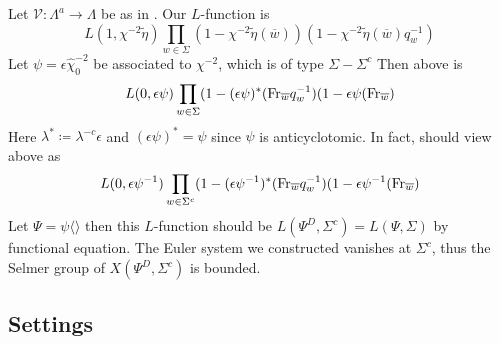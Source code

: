 \documentclass[leqno]{amsart}
\newcommand{\bw}{\overline{w}}
\newcommand{\Fr}{\textnormal{Fr}} %
\theoremstyle{definition}
\theoremstyle{remark}
\begin{document}
Let $\mathscr{V}\colon \Lambda^a\to \Lambda$
be as in \cite{HT94}.
Our $L$-function is
\[
L(1,\chi^{-2}\tilde{\eta})\prod_{w\in\Sigma}
(1-\chi^{-2}\tilde{\eta}(\bw))
(1-\chi^{-2}\tilde{\eta}(\bw)q_w^{-1})
\]
Let $\psi=\epsilon\hat{\chi}_0^{-2}$ be associated to 
$\chi^{-2}$, which is of type $\Sigma-\Sigma^c$
Then above is 
\[
	L(0,\epsilon\psi)\prod_{w\in \Sigma}
	(1-(\epsilon\psi)^*(\Fr_{\bw}q_w^{-1})
	(1-\epsilon\psi(\Fr_{\bw})
\]
Here  $\lambda^*\coloneqq \lambda^{-c}\epsilon$ 
and $(\epsilon\psi)^*=\psi$ since  $\psi$
is anticyclotomic.
In fact, should view above as
\[
	L(0,\epsilon\psi^{-1})\prod_{w\in\Sigma^c}
	(1-(\epsilon\psi^{-1})^*(\Fr_{\bw}q_w^{-1})
	(1-\epsilon\psi^{-1}(\Fr_{\bw})
\]
Let $\Psi=\psi\langle\rangle$
then this  $L$-function
should be $L(\Psi^D,\Sigma^c)=L(\Psi,\Sigma)$
by functional equation.
The Euler system we constructed vanishes at  $\Sigma^c$,
thus the Selmer group of  $X(\Psi^D,\Sigma^c)$
is bounded. 


\cite{Och05}
\cite{Och08}
\cite{Hsieh2010}
\cite{HT93}
\cite{Hida06}
\cite{Hida06b}
\cite{Rubin}

\subsection{Settings}




\end{document}
